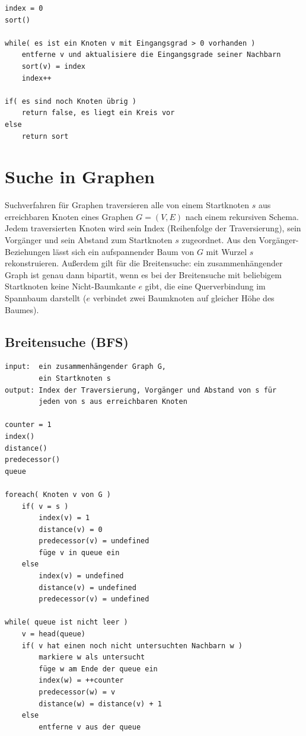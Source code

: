 \documentclass[10pt,a4paper,landscape]{article}
\begin{document}
\begin{multicols*}{2}
\begin{verbatim}
index = 0
sort()

while( es ist ein Knoten v mit Eingangsgrad > 0 vorhanden )
    entferne v und aktualisiere die Eingangsgrade seiner Nachbarn
    sort(v) = index
    index++

if( es sind noch Knoten übrig )
    return false, es liegt ein Kreis vor
else 
    return sort
    \end{verbatim}
\normalsize

\section{ Suche in Graphen }
    Suchverfahren für Graphen traversieren alle von einem Startknoten $s$ aus erreichbaren Knoten 
    eines Graphen $G = (V,E)$ nach einem rekursiven Schema. Jedem traversierten Knoten wird sein Index 
    (Reihenfolge der Traversierung), sein Vorgänger und sein Abstand zum Startknoten $s$ zugeordnet.
    Aus den Vorgänger-Beziehungen lässt sich ein aufspannender Baum von $G$ mit Wurzel $s$ rekonstruieren.
    \newline
    Außerdem gilt für die Breitensuche: ein zusammenhängender Graph ist genau dann bipartit, wenn es bei der Breitensuche mit beliebigem Startknoten 
    keine Nicht-Baumkante $e$ gibt, die eine Querverbindung im Spannbaum darstellt ($e$ verbindet zwei Baumknoten 
    auf gleicher Höhe des Baumes).
    \subsection{ Breitensuche (BFS) }
    \small
\begin{verbatim}
input:  ein zusammenhängender Graph G, 
        ein Startknoten s
output: Index der Traversierung, Vorgänger und Abstand von s für 
        jeden von s aus erreichbaren Knoten

counter = 1
index()
distance()
predecessor()
queue

foreach( Knoten v von G )
    if( v = s )
        index(v) = 1
        distance(v) = 0
        predecessor(v) = undefined
        füge v in queue ein
    else
        index(v) = undefined
        distance(v) = undefined
        predecessor(v) = undefined

while( queue ist nicht leer )
    v = head(queue)
    if( v hat einen noch nicht untersuchten Nachbarn w )
        markiere w als untersucht
        füge w am Ende der queue ein
        index(w) = ++counter
        predecessor(w) = v
        distance(w) = distance(v) + 1
    else
        entferne v aus der queue


\end{verbatim}
\end{multicols*}
\end{document}

